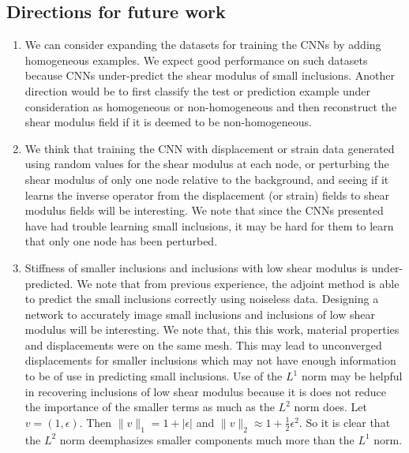 \documentclass[12pt]{article}
\begin{document}
\subsection{Directions for future work}
\begin{enumerate}
\item{We can consider expanding the datasets for training the CNNs by adding homogeneous examples. We expect good performance on such datasets because CNNs under-predict the shear modulus of small inclusions. Another direction would be to first classify the test or prediction example under consideration as homogeneous or non-homogeneous and then reconstruct the shear modulus field if it is deemed to be non-homogeneous.}
\item{We think that training the CNN with displacement or strain data generated using random values for the shear modulus at each node, or perturbing the shear modulus of only one node relative to the background, and seeing if it learns the inverse operator from the displacement (or strain) fields to shear modulus fields will be interesting. We note that since the CNNs presented have had trouble learning small inclusions, it may be hard for them to learn that only one node has been perturbed.}%
\item{Stiffness of smaller inclusions and inclusions with low shear modulus is under-predicted. We note that from previous experience, the adjoint method \cite{paper:oberai2003,paper:oberaipmb2004,paper:gokhale2008} is able to predict the small inclusions correctly using noiseless data. Designing a network to accurately image small inclusions and inclusions of low shear modulus will be interesting. We note that, this this work,  material properties and displacements were on the same mesh. This may lead to unconverged displacements for smaller inclusions which may not have enough information to be of use in predicting small inclusions. Use of the $L^1$ norm may be helpful in recovering inclusions of low shear modulus because it is does not reduce the importance of the smaller terms as much as the $L^2$ norm does. Let $v=(1,\epsilon)$. Then $\|v\|_1=1+|\epsilon|$ and $\|v\|_2\approx1+\frac{1}{2}\epsilon^2$. So it is clear that the $L^2$ norm deemphasizes smaller components much more than the $L^1$ norm.}

\end{enumerate}
\end{document}
